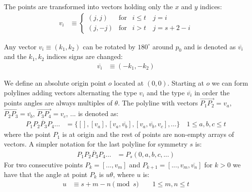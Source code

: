 \documentclass[11pt]{article}
\begin{document}
The points are transformed into vectors holding only the $x$ and $y$ indices:
\begin{align}
v_i &\equiv \left\{ \begin{array}{ccl}
 ( j, j ) & \mbox{for} & i \leq t \quad j = i\\
 ( j, -j ) & \mbox{for} & i > t \quad j = s+2-i
 \end{array}\right. \label{eq:vectors}
\end{align}

Any vector $v_i \equiv (k_1,k_2)$ can be rotated by $180^\circ$ around $p_0$ and is denoted as $\overline{v_i}$ and the $k_1,k_2$ indices signs are changed:
\begin{align}
\overline{v_i} &\equiv (-k_1, -k_2) \label{eq:vector180}
\end{align}

We define an absolute origin point $o$ located at $(0,0)$. Starting at $o$ we can form polylines adding vectors alternating the type $v_i$ and the type $\overline{v_i}$ in order the points angles are always multiples of $\theta$. The polyline with vectors $\overrightarrow{P_1P_2}=v_a$, $\overrightarrow{P_2P_3}=\overline{v_b}$, $\overrightarrow{P_3P_4}=v_c$, ... is denoted as:
\begin{align}
\overline{P_1P_2P_3P_4...} &= \{ [], [v_a], [v_a,\overline{v_b}],[v_a,\overline{v_b},v_c],... \} 
 \quad 1 \leq a,b,c \leq t
\end{align}
where the point $P_1$ is at origin and the rest of points are non-empty arrays of vectors. A simpler notation for the last polyline for symmetry $s$ is:
\begin{align}
\overline{P_1P_2P_3P_4...} &= P_s(0,a,b,c,...)
\end{align}
For two consecutive points $P_k = [...,v_m]$ and $P_{k+1} = [...,v_m,\overline{v_n}]$ for $k>0$ we have that the angle at point $P_k$ is $u\theta$, where $u$ is:
\begin{align}
u &\equiv s + m - n \pmod{s} \quad  \quad 1 \leq m,n \leq t \label{eq:angle}
\end{align}
\end{document}
